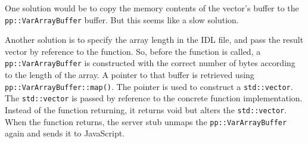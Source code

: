 One solution would be to copy the memory contents of the vector's buffer to the \lstinline{pp::VarArrayBuffer} buffer. But this seems like a slow solution.

Another solution is to specify the array length in the IDL file, and pass the result vector by reference to the function. So, before the function is called, a \lstinline{pp::VarArrayBuffer} is constructed with the correct number of bytes according to the length of the array. A pointer to that buffer is retrieved using \lstinline{pp::VarArrayBuffer::map()}. The pointer is used to construct a \lstinline{std::vector}. The \lstinline{std::vector} is passed by reference to the concrete function implementation. Instead of the function returning, it returns void but alters the \lstinline{std::vector}. When the function returns, the server stub unmaps the \lstinline{pp::VarArrayBuffer} again and sends it to JavaScript.
